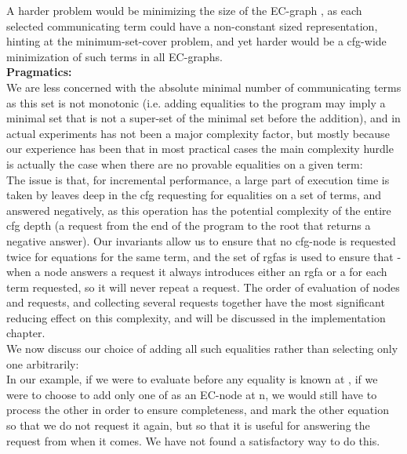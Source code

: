 A harder problem would be minimizing the size of the EC-graph , as each selected communicating term could have a non-constant sized representation, hinting at the minimum-set-cover problem, and yet harder would be a cfg-wide minimization of such terms in all EC-graphs.\\
\textbf{Pragmatics:}\\
We are less concerned with the absolute minimal number of communicating terms as this set is not monotonic (i.e. adding equalities to the program may imply a minimal set that is not a super-set of the minimal set before the addition), and in actual experiments has not been a major complexity factor, but mostly because our experience has been that in most practical cases the main complexity hurdle is actually the case when there are no provable equalities on a given term:\\
The issue is that, for incremental performance, a large part of execution time is taken by leaves deep in the cfg requesting for equalities on a set of terms, and answered negatively, as this operation has the potential complexity of the entire cfg depth (a request from the end of the program to the root that returns a negative answer).
Our invariants allow us to ensure that no cfg-node is requested twice for equations for the same term, and the set of rgfas is used to ensure that - when a node answers a request it always introduces either an rgfa or a \GFA{} for each term requested, so it will never repeat a request. The order of evaluation of nodes and requests, and collecting several requests together have the most significant reducing effect on this complexity, and will be discussed in the implementation chapter.\\
We now discuss our choice of adding all such equalities rather than selecting only one arbitrarily:\\
In our example, if we were to evaluate  before any equality is known at , 
if we were to choose to add only one of  as an EC-node at n, 
we would still have to process the other in order to ensure completeness, and mark the other equation so that we do not request it again, 
but so that it is useful for answering the request from  when it comes. We have not found a satisfactory way to do this.\\
